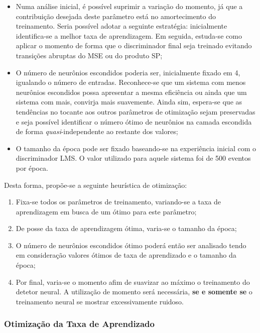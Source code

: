 \begin{itemize}
\item Numa análise inicial, é possível suprimir a variação do momento, já que
a contribuição desejada deste parâmetro está no amortecimento do
treinamento. Seria possível adotar a seguinte estratégia: inicialmente
identifica-se a melhor taxa de aprendizagem. Em seguida, estuda-se como
aplicar o momento de forma que o discriminador final seja treinado evitando
transições abruptas do MSE ou do produto SP;

\item O número de neurônios escondidos poderia ser, inicialmente fixado em 4,
igualando o número de entradas. Reconhece-se que um sistema com menos
neurônios escondidos possa apresentar a mesma eficiência ou ainda que um
sistema com mais, convirja mais suavemente. Ainda sim, espera-se que as
tendências no tocante aos outros parâmetros de otimização sejam preservadas e
seja possível identificar o número ótimo de neurônios na camada escondida de
forma \textit{quasi}-independente ao restante dos valores;

\item O tamanho da época pode ser fixado baseando-se na experiência inicial
com o discriminador LMS. O valor utilizado para aquele sistema foi de 500
eventos por época.
\end{itemize}

Desta forma, propõe-se a seguinte heurística de otimização:

\begin{enumerate}
\item Fixa-se todos os parâmetros de treinamento, variando-se a taxa de
aprendizagem em busca de um ótimo para este parâmetro;
\item De posse da taxa de aprendizagem ótima, varia-se o tamanho da época;
\item O número de neurônios escondidos ótimo poderá então ser analisado tendo
em consideração valores ótimos de taxa de aprendizado e o tamanho da época;
\item Por final, varia-se o momento afim de suavizar ao máximo o treinamento
do detetor neural. A utilização de momento será necessária, \textbf{se e
somente se} o treinamento neural se mostrar excessivamente ruidoso.
\end{enumerate}

\subsubsection{Otimização da Taxa de Aprendizado}

